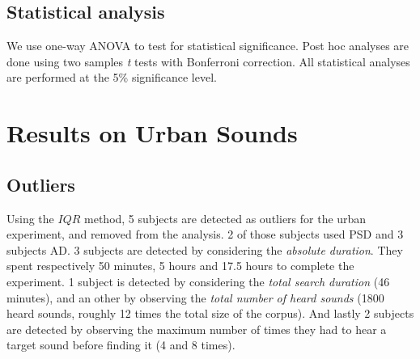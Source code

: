 \documentclass{aes2e}
\begin{document}
\subsection{Statistical analysis}

We use one-way ANOVA to test for statistical significance. Post hoc analyses are done using two samples \textit{t} tests with Bonferroni correction. All statistical analyses are performed at the 5\% significance level.%


\section{Results on Urban Sounds} \label{resultsu}

\subsection{Outliers}


Using the $IQR$ method, 5 subjects are detected as outliers for the urban experiment, and removed from the analysis. 2 of those subjects used PSD and 3 subjects AD. %
3 subjects are detected by considering the \textit{absolute duration}. They spent respectively 50 minutes, 5 hours and 17.5 hours to complete the experiment. 1 subject is detected by considering the \textit{total search duration} (46 minutes), and an other by observing the \textit{total number of heard sounds} (1800 heard sounds, roughly 12 times the total size of the corpus). And lastly 2 subjects are detected by observing the maximum number of times they had to hear a target sound before finding it (4 and 8 times).
\end{document}
